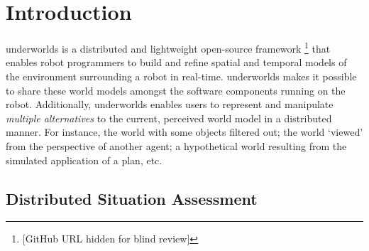 \documentclass[conference]{IEEEtran}
\newcommand{\uwds}{{\sc underworlds}\xspace}
\begin{document}
\IEEEpeerreviewmaketitle


\section{Introduction}


\uwds is a distributed and lightweight open-source
framework \footnote{[GitHub URL hidden for blind review]} that
enables robot programmers to build and refine spatial and temporal
models of the environment surrounding a robot in real-time. \uwds makes it possible to share
these world models amongst the software components running on the robot.
Additionally, \uwds enables users to represent and manipulate
\emph{multiple alternatives} to the current, perceived world model in a distributed manner. For
instance, the world with some objects filtered out; the world `viewed' from the
perspective of another agent; a hypothetical world resulting from the simulated
application of a plan, etc.


\subsection{Distributed Situation Assessment}
\end{document}
